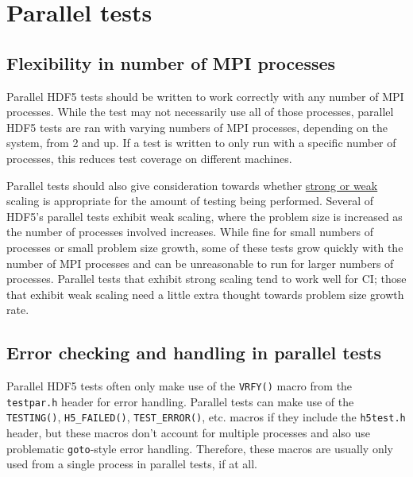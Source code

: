 \documentclass[../HDF5_RFC.tex]{subfiles}
\begin{document}
\section{Parallel tests}
\label{parallel}

\subsection{Flexibility in number of MPI processes}

Parallel HDF5 tests should be written to work correctly with any number of MPI processes. While the
test may not necessarily use all of those processes, parallel HDF5 tests are ran with varying numbers
of MPI processes, depending on the system, from 2 and up. If a test is written to only run with a
specific number of processes, this reduces test coverage on different machines.

Parallel tests should also give consideration towards whether
\href{https://hpc-wiki.info/hpc/Scaling#Strong_or_Weak_Scaling}{strong or weak} scaling is appropriate
for the amount of testing being performed. Several of HDF5's parallel tests exhibit weak scaling, where
the problem size is increased as the number of processes involved increases. While fine for small
numbers of processes or small problem size growth, some of these tests grow quickly with the number of
MPI processes and can be unreasonable to run for larger numbers of processes. Parallel tests that
exhibit strong scaling tend to work well for CI; those that exhibit weak scaling need a little extra
thought towards problem size growth rate.

\subsection{Error checking and handling in parallel tests}

Parallel HDF5 tests often only make use of the \texttt{VRFY()} macro from the \texttt{testpar.h} header
for error handling. Parallel tests can make use of the \texttt{TESTING()}, \texttt{H5\_FAILED()},
\texttt{TEST\_ERROR()}, etc. macros if they include the \texttt{h5test.h} header, but these macros
don't account for multiple processes and also use problematic \texttt{goto}-style error handling.
Therefore, these macros are usually only used from a single process in parallel tests, if at all.
\end{document}

